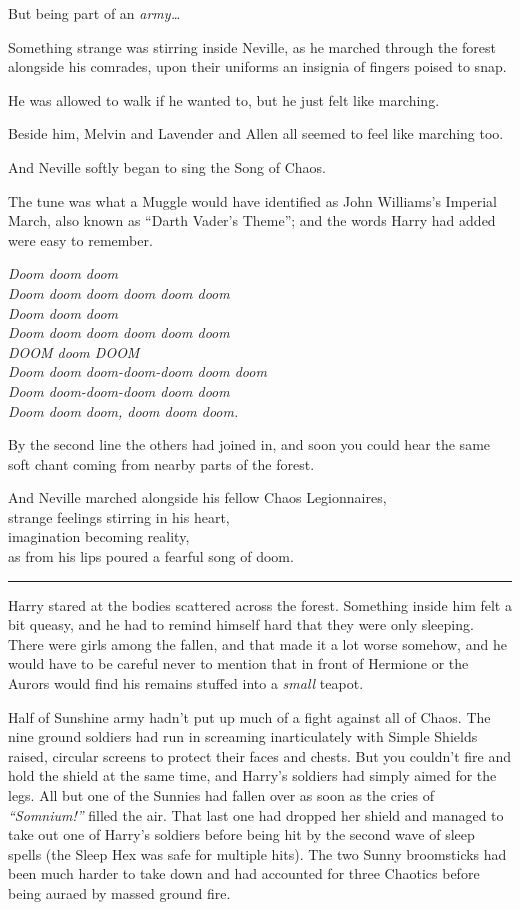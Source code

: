 But being part of an \emph{army\ldots{}}

Something strange was stirring inside Neville, as he marched through the
forest alongside his comrades, upon their uniforms an insignia of
fingers poised to snap.

He was allowed to walk if he wanted to, but he just felt like marching.

Beside him, Melvin and Lavender and Allen all seemed to feel like
marching too.

And Neville softly began to sing the Song of Chaos.

The tune was what a Muggle would have identified as John Williams's
Imperial March, also known as ``Darth Vader's Theme''; and the words
Harry had added were easy to remember.

\emph{Doom doom doom}\\\emph{Doom doom doom doom doom doom}\\\emph{Doom
doom doom}\\\emph{Doom doom doom doom doom doom}\\\emph{DOOM doom
DOOM}\\\emph{Doom doom doom-doom-doom doom doom}\\\emph{Doom
doom-doom-doom doom doom}\\\emph{Doom doom doom, doom doom doom.}

By the second line the others had joined in, and soon you could hear the
same soft chant coming from nearby parts of the forest.

And Neville marched alongside his fellow Chaos Legionnaires,\\strange
feelings stirring in his heart,\\imagination becoming reality,\\as from
his lips poured a fearful song of doom.

\begin{center}\rule{3in}{0.4pt}\end{center}

Harry stared at the bodies scattered across the forest. Something inside
him felt a bit queasy, and he had to remind himself hard that they were
only sleeping. There were girls among the fallen, and that made it a lot
worse somehow, and he would have to be careful never to mention that in
front of Hermione or the Aurors would find his remains stuffed into a
\emph{small} teapot.

Half of Sunshine army hadn't put up much of a fight against all of
Chaos. The nine ground soldiers had run in screaming inarticulately with
Simple Shields raised, circular screens to protect their faces and
chests. But you couldn't fire and hold the shield at the same time, and
Harry's soldiers had simply aimed for the legs. All but one of the
Sunnies had fallen over as soon as the cries of \emph{``Somnium!''}
filled the air. That last one had dropped her shield and managed to take
out one of Harry's soldiers before being hit by the second wave of sleep
spells (the Sleep Hex was safe for multiple hits). The two Sunny
broomsticks had been much harder to take down and had accounted for
three Chaotics before being auraed by massed ground fire.

